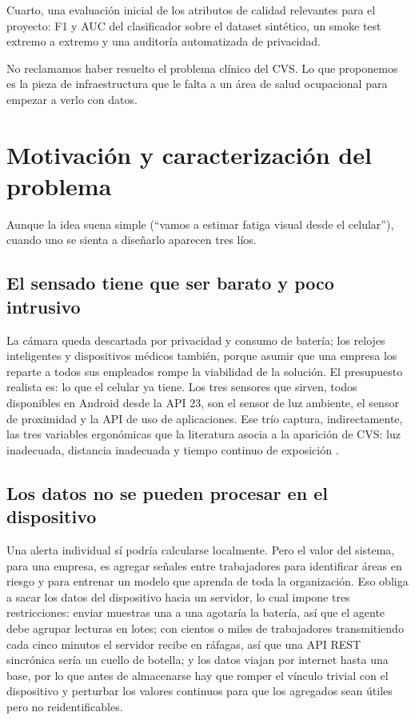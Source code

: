 \documentclass[conference]{IEEEtran}
\begin{document}
Cuarto, una evaluación inicial de los atributos de calidad relevantes 
para el proyecto: F1 y AUC del clasificador sobre el dataset sintético, 
un smoke test extremo a extremo y una auditoría automatizada de 
privacidad.

No reclamamos haber resuelto el problema clínico del CVS. Lo que 
proponemos es la pieza de infraestructura que le falta a un área de 
salud ocupacional para empezar a verlo con datos.

\section{Motivación y caracterización del problema}\label{sec:motivacion}

Aunque la idea suena simple (``vamos a estimar fatiga visual desde el 
celular''), cuando uno se sienta a diseñarlo aparecen tres líos.

\subsection{El sensado tiene que ser barato y poco intrusivo}

La cámara queda descartada por privacidad y consumo de batería; los 
relojes inteligentes y dispositivos médicos también, porque asumir que 
una empresa los reparte a todos sus empleados rompe la viabilidad de la 
solución. El presupuesto realista es: lo que el celular ya tiene. Los 
tres sensores que sirven, todos disponibles en Android desde la API 23, 
son el sensor de luz ambiente, el sensor de proximidad y la API de uso 
de aplicaciones. Ese trío captura, indirectamente, las tres variables 
ergonómicas que la literatura asocia a la aparición de CVS: luz 
inadecuada, distancia inadecuada y tiempo continuo de exposición 
\cite{blehm2005,sheppard2018}.

\subsection{Los datos no se pueden procesar en el dispositivo}

Una alerta individual sí podría calcularse localmente. Pero el valor 
del sistema, para una empresa, es agregar señales entre trabajadores 
para identificar áreas en riesgo y para entrenar un modelo que aprenda 
de toda la organización. Eso obliga a sacar los datos del dispositivo 
hacia un servidor, lo cual impone tres restricciones: enviar muestras 
una a una agotaría la batería, así que el agente debe agrupar lecturas 
en lotes; con cientos o miles de trabajadores transmitiendo cada cinco 
minutos el servidor recibe en ráfagas, así que una API REST sincrónica 
sería un cuello de botella; y los datos viajan por internet hasta una 
base, por lo que antes de almacenarse hay que romper el vínculo trivial 
con el dispositivo y perturbar los valores continuos para que los 
agregados sean útiles pero no reidentificables.
\end{document}
